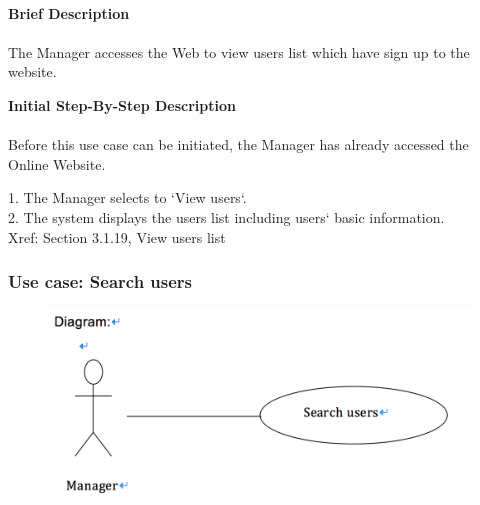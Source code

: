 \documentclass[12pt]{report}
\begin{document}
\paragraph{}
\begin{flushleft}
\textbf{Brief Description }
\paragraph{}
The Manager accesses the Web to view users list which have sign up to the website.\\

\begin{flushleft}
\textbf{Initial Step-By-Step Description }
\paragraph{}
Before this use case can be initiated, the Manager has already accessed the Online Website.

\begin{flushleft}
1.	The Manager selects to `View users`. \\
2.	The system displays the users list including users` basic information. \\
Xref: Section 3.1.19, View users list
\end{flushleft}
\end{flushleft}
\end{flushleft}

\newpage
\subsubsection{Use case:  Search users }

\begin{figure}[!htb]
  \includegraphics{26.PNG}
\end{figure}
\end{document}
